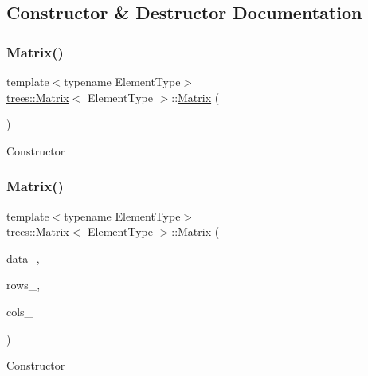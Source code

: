 \subsection{Constructor \& Destructor Documentation}
\mbox{\label{classtrees_1_1_matrix_a363bff5b1ded7ead42eeb72cfee359f3}} 
\subsubsection{\texorpdfstring{Matrix()}{Matrix()}\hspace{0.1cm}{\footnotesize\ttfamily [1/3]}}
{\footnotesize\ttfamily template$<$typename Element\+Type$>$ \\
\hyperlink{classtrees_1_1_matrix}{trees\+::\+Matrix}$<$ Element\+Type $>$\+::\hyperlink{classtrees_1_1_matrix}{Matrix} (\begin{DoxyParamCaption}\item[{void}]{ }\end{DoxyParamCaption})\hspace{0.3cm}{\ttfamily [inline]}}

Constructor \mbox{\label{classtrees_1_1_matrix_a476f805286aeea991d815402c2ff703a}} 
\subsubsection{\texorpdfstring{Matrix()}{Matrix()}\hspace{0.1cm}{\footnotesize\ttfamily [2/3]}}
{\footnotesize\ttfamily template$<$typename Element\+Type$>$ \\
\hyperlink{classtrees_1_1_matrix}{trees\+::\+Matrix}$<$ Element\+Type $>$\+::\hyperlink{classtrees_1_1_matrix}{Matrix} (\begin{DoxyParamCaption}\item[{Element\+Type $\ast$}]{data\+\_\+,  }\item[{size\+\_\+t}]{rows\+\_\+,  }\item[{size\+\_\+t}]{cols\+\_\+ }\end{DoxyParamCaption})\hspace{0.3cm}{\ttfamily [inline]}}

Constructor


